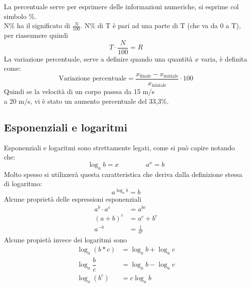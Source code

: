 La percentuale serve per esprimere delle informazioni numeriche, si esprime col simbolo \%.\\ 
N\% ha il significato di $\frac{N}{100}$. N\% di T è pari ad una parte di T (che va da 0 a T), 
per riassumere quindi 
\begin{equation*}
  T\cdot\frac{N}{100}=R
\end{equation*}
La variazione percentuale, serve a definire quando una quantità $x$ varia, è definita come:
\begin{equation*}
  \text{Variazione percentuale}=
  \frac{x_{\text{finale}}-x_{\text{iniziale}}}{x_{\text{iniziale}}}\cdot100
\end{equation*}
Quindi se la velocità di un corpo passsa da 15 m/s\\ a 20 m/s, vi è stato un aumento percentuale del 33,3\%.\\

\subsection{Esponenziali e logaritmi}
Esponenziali e logaritmi sono strettamente legati, come si può capire notando che:
\begin{equation*}
  \log_{a} b=x\qquad \qquad
  a^{x}=b
\end{equation*}
Molto spesso si utilizzerà questa caratteristica che deriva dalla definizione stessa di logaritmo:
\begin{equation*}
  a^{\log_{a}b}=b
\end{equation*}
Alcune proprietà delle espressioni esponenziali
\begin{align*}
  a^{b}\cdot a^{c}&=a^{bc}\\
  (a+b)^{c}&=a^{c}+b^{c}\\
  a^{-b}&=\frac{1}{a^{b}}
\end{align*}
Alcune propietà invece dei logaritmi sono
\begin{align*}
  \log_{a}(b*c)&=\log_{a}b+\log_{a}c\\
  \log_{a}\dfrac{b}{c}&=\log_{a}b-\log_{a}c\\
  \log_{a}(b^{c})&=c\log_{a}b
\end{align*}

